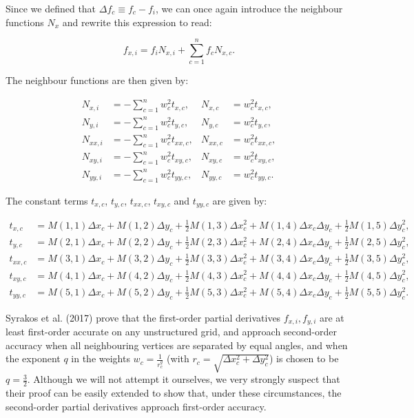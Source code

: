 \documentclass{article}
\begin{document}
Since we defined that $\Delta f_c \equiv f_c - f_i$, we can once again introduce the neighbour functions $N_x$ and rewrite this expression to read:

\begin{equation} \label{eq:disc_LSNxi}
f_{x,i} = f_i N_{x,i} + \sum_{c=1}^n f_c N_{x,c}.
\end{equation}

The neighbour functions are then given by:

\begin{align} \label{eq:disc_LSNxi2}
N_{x,i} &= - \sum_{c=1}^n w_c^2 t_{x,c}, & N_{x,c} &= w_c^2 t_{x,c}, \\
N_{y,i} &= - \sum_{c=1}^n w_c^2 t_{y,c}, & N_{y,c} &= w_c^2 t_{y,c}, \\
N_{xx,i} &= - \sum_{c=1}^n w_c^2 t_{xx,c}, & N_{xx,c} &= w_c^2 t_{xx,c}, \\
N_{xy,i} &= - \sum_{c=1}^n w_c^2 t_{xy,c}, & N_{xy,c} &= w_c^2 t_{xy,c}, \\
N_{yy,i} &= - \sum_{c=1}^n w_c^2 t_{yy,c}, & N_{yy,c} &= w_c^2 t_{yy,c}.
\end{align}

The constant terms $t_{x,c}$, $t_{y,c}$, $t_{xx,c}$, $t_{xy,c}$ and $t_{yy,c}$ are given by:

\begin{align} \label{eq:disc_LStxty}
t_{x,c} &= M(1,1) \Delta x_c + M(1,2) \Delta y_c + \frac12 M(1,3) \Delta x_c^2 + M(1,4) \Delta x_c \Delta y_c + \frac12 M(1,5) \Delta y_c^2, \\
t_{y,c} &= M(2,1) \Delta x_c + M(2,2) \Delta y_c + \frac12 M(2,3) \Delta x_c^2 + M(2,4) \Delta x_c \Delta y_c + \frac12 M(2,5) \Delta y_c^2, \\
t_{xx,c} &= M(3,1) \Delta x_c + M(3,2) \Delta y_c + \frac12 M(3,3) \Delta x_c^2 + M(3,4) \Delta x_c \Delta y_c + \frac12 M(3,5) \Delta y_c^2, \\
t_{xy,c} &= M(4,1) \Delta x_c + M(4,2) \Delta y_c + \frac12 M(4,3) \Delta x_c^2 + M(4,4) \Delta x_c \Delta y_c + \frac12 M(4,5) \Delta y_c^2, \\
t_{yy,c} &= M(5,1) \Delta x_c + M(5,2) \Delta y_c + \frac12 M(5,3) \Delta x_c^2 + M(5,4) \Delta x_c \Delta y_c + \frac12 M(5,5) \Delta y_c^2.
\end{align}

Syrakos et al. (2017) prove that the first-order partial derivatives $f_{x,i}, f_{y,i}$ are at least first-order accurate on any unstructured grid, and approach second-order accuracy when all neighbouring vertices are separated by equal angles, and when the exponent $q$ in the weights $w_c = \frac{1}{r_c^q}$ (with $r_c = \sqrt{\Delta x_c^2 + \Delta y_c^2}$) is chosen to be $q = \frac32$. Although we will not attempt it ourselves, we very strongly suspect that their proof can be easily extended to show that, under these circumstances, the second-order partial derivatives approach first-order accuracy.
\end{document}
